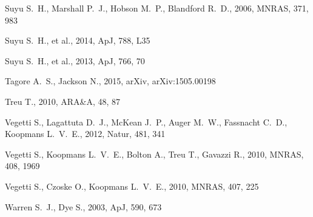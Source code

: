 \documentclass[useAMS,usenatbib]{mn2e}
\begin{document}
\begin{thebibliography}{99}
Suyu S.~H., Marshall P.~J., Hobson M.~P., Blandford R.~D., 2006, MNRAS, 
371, 983

Suyu S.~H., et al., 2014, ApJ, 788, L35 

Suyu S.~H., et al., 2013, ApJ, 766, 70 

 Tagore A.~S., Jackson N., 2015, arXiv, arXiv:1505.00198

 Treu T., 2010, ARA\&A, 48, 87 

 Vegetti S., Lagattuta D.~J., McKean J.~P., 
Auger M.~W., Fassnacht C.~D., Koopmans L.~V.~E., 2012, Natur, 481, 341 

 Vegetti S., Koopmans L.~V.~E., Bolton A., 
Treu T., Gavazzi R., 2010, MNRAS, 408, 1969 

 Vegetti S., Czoske O., Koopmans L.~V.~E., 2010, MNRAS, 407, 225

 Warren S.~J., Dye S., 2003, ApJ, 590, 673
\end{thebibliography}
\end{document}
